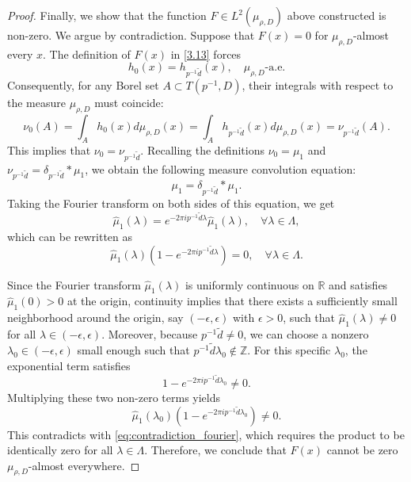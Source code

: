 \documentclass[11pt]{article}
\numberwithin{equation}{section}
\begin{document}
\begin{proof}
Finally, we show that the function $F \in L^2(\mu_{\rho,D})$ above constructed is non-zero. We argue by contradiction. Suppose that $F(x) = 0$ for $\mu_{\rho,D}$-almost every $x$. The definition of $F(x)$ in \eqref{3.13} forces 
\begin{equation*}
	h_0(x) = h_{p^{-1}\tilde{d}}(x), \quad \mu_{\rho,D}\text{-a.e.}
\end{equation*}
Consequently, for any Borel set $A \subset T(p^{-1},D)$, their integrals with respect to the measure $\mu_{\rho,D}$ must coincide:
\begin{equation*}
	\nu_0(A) = \int_A h_0(x) d\mu_{\rho,D}(x) = \int_A h_{p^{-1}\tilde{d}}(x) d\mu_{\rho,D}(x) = \nu_{p^{-1}\tilde{d}}(A).
\end{equation*}
This implies that $\nu_0 = \nu_{p^{-1}\tilde{d}}$. Recalling the definitions $\nu_0 = \mu_1$ and $\nu_{p^{-1}\tilde{d}} = \delta_{p^{-1}\tilde{d}} \ast \mu_1$, we obtain the following measure convolution equation:
\begin{equation*}
	\mu_1 = \delta_{p^{-1}\tilde{d}} \ast \mu_1.
\end{equation*}
Taking the Fourier transform on both sides of this equation, we get
\begin{equation*}
	\widehat{\mu}_1(\lambda) = e^{-2\pi i p^{-1}\tilde{d} \lambda} \widehat{\mu}_1(\lambda), \quad \forall \lambda \in \Lambda,
\end{equation*}
which can be rewritten as
\begin{equation} \label{eq:contradiction_fourier}
	\widehat{\mu}_1(\lambda) \left( 1 - e^{-2\pi i p^{-1}\tilde{d} \lambda} \right) = 0, \quad \forall \lambda \in \Lambda.
\end{equation}

Since the Fourier transform $\widehat{\mu}_1(\lambda)$ is uniformly continuous on $\mathbb{R}$ and satisfies $\widehat{\mu}_1(0) > 0$ at the origin, continuity implies that there exists a sufficiently small neighborhood around the origin, say $(-\epsilon, \epsilon)$ with $\epsilon > 0$, such that $\widehat{\mu}_1(\lambda) \neq 0$ for all $\lambda \in (-\epsilon, \epsilon)$.
Moreover, because $p^{-1}\tilde{d} \neq 0$, we can choose a nonzero $\lambda_0 \in (-\epsilon, \epsilon)$ small enough such that $p^{-1}\tilde{d} \lambda_0 \notin \mathbb{Z}$. For this specific $\lambda_0$, the exponential term satisfies
\begin{equation*}
	1 - e^{-2\pi i p^{-1}\tilde{d} \lambda_0} \neq 0.
\end{equation*}
Multiplying these two non-zero terms yields 
\begin{equation*}
	\widehat{\mu}_1(\lambda_0) \left( 1 - e^{-2\pi i p^{-1}\tilde{d} \lambda_0} \right) \neq 0.
\end{equation*}
This  contradicts with  \eqref{eq:contradiction_fourier}, which requires the product to be identically zero for all $\lambda \in \Lambda$.
Therefore, we conclude that $F(x)$ cannot be zero $\mu_{\rho,D}$-almost everywhere. 



\end{proof}
\end{document}
